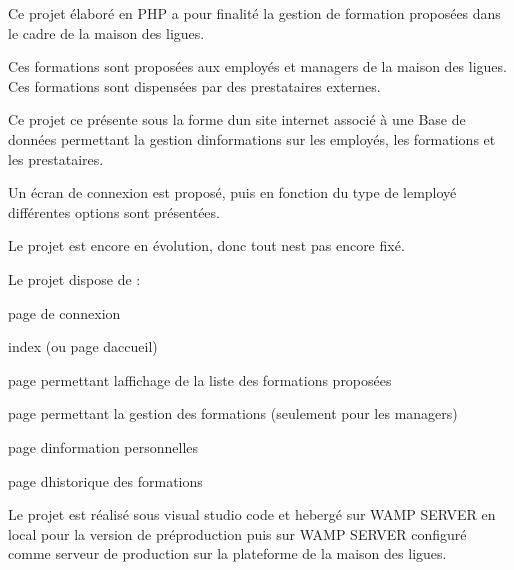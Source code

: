 Ce projet élaboré en P\+HP a pour finalité la gestion de formation proposées dans le cadre de la maison des ligues.

Ces formations sont proposées aux employés et managers de la maison des ligues. Ces formations sont dispensées par des prestataires externes.

Ce projet ce présente sous la forme d\textquotesingle{}un site internet associé à une Base de données permettant la gestion d\textquotesingle{}informations sur les employés, les formations et les prestataires.

Un écran de connexion est proposé, puis en fonction du type de l\textquotesingle{}employé différentes options sont présentées.

Le projet est encore en évolution, donc tout n\textquotesingle{}est pas encore fixé.

Le projet dispose de \+:


\begin{DoxyItemize}
\item page de connexion
\item index (ou page d\textquotesingle{}accueil)
\item page permettant l\textquotesingle{}affichage de la liste des formations proposées
\item page permettant la gestion des formations (seulement pour les managers)
\item page d\textquotesingle{}information personnelles
\item page d\textquotesingle{}historique des formations
\end{DoxyItemize}

Le projet est réalisé sous visual studio code et hebergé sur W\+A\+MP S\+E\+R\+V\+ER en local pour la version de préproduction puis sur W\+A\+MP S\+E\+R\+V\+ER configuré comme serveur de production sur la plateforme de la maison des ligues. 